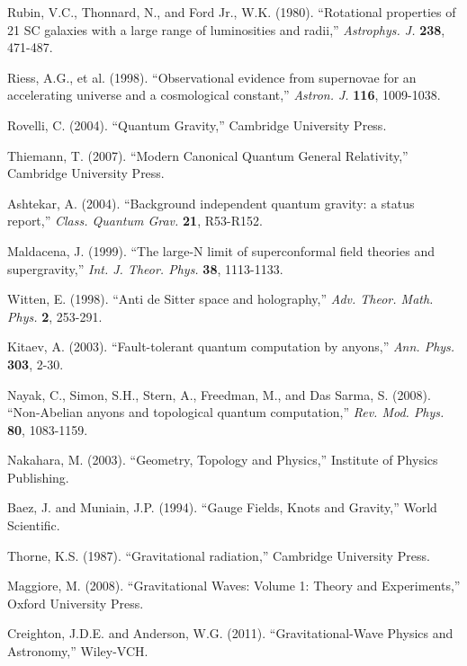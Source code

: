 \documentclass[12pt,a4paper]{article}
\begin{document}
\begin{thebibliography}{200}
Rubin, V.C., Thonnard, N., and Ford Jr., W.K. (1980). ``Rotational properties of 21 SC galaxies with a large range of luminosities and radii,'' \textit{Astrophys. J.} \textbf{238}, 471-487.

Riess, A.G., et al. (1998). ``Observational evidence from supernovae for an accelerating universe and a cosmological constant,'' \textit{Astron. J.} \textbf{116}, 1009-1038.

Rovelli, C. (2004). ``Quantum Gravity,'' Cambridge University Press.

Thiemann, T. (2007). ``Modern Canonical Quantum General Relativity,'' Cambridge University Press.

Ashtekar, A. (2004). ``Background independent quantum gravity: a status report,'' \textit{Class. Quantum Grav.} \textbf{21}, R53-R152.

Maldacena, J. (1999). ``The large-N limit of superconformal field theories and supergravity,'' \textit{Int. J. Theor. Phys.} \textbf{38}, 1113-1133.

Witten, E. (1998). ``Anti de Sitter space and holography,'' \textit{Adv. Theor. Math. Phys.} \textbf{2}, 253-291.

Kitaev, A. (2003). ``Fault-tolerant quantum computation by anyons,'' \textit{Ann. Phys.} \textbf{303}, 2-30.

Nayak, C., Simon, S.H., Stern, A., Freedman, M., and Das Sarma, S. (2008). ``Non-Abelian anyons and topological quantum computation,'' \textit{Rev. Mod. Phys.} \textbf{80}, 1083-1159.

Nakahara, M. (2003). ``Geometry, Topology and Physics,'' Institute of Physics Publishing.

Baez, J. and Muniain, J.P. (1994). ``Gauge Fields, Knots and Gravity,'' World Scientific.

Thorne, K.S. (1987). ``Gravitational radiation,'' Cambridge University Press.

Maggiore, M. (2008). ``Gravitational Waves: Volume 1: Theory and Experiments,'' Oxford University Press.

Creighton, J.D.E. and Anderson, W.G. (2011). ``Gravitational-Wave Physics and Astronomy,'' Wiley-VCH.


\end{thebibliography}
\end{document}
